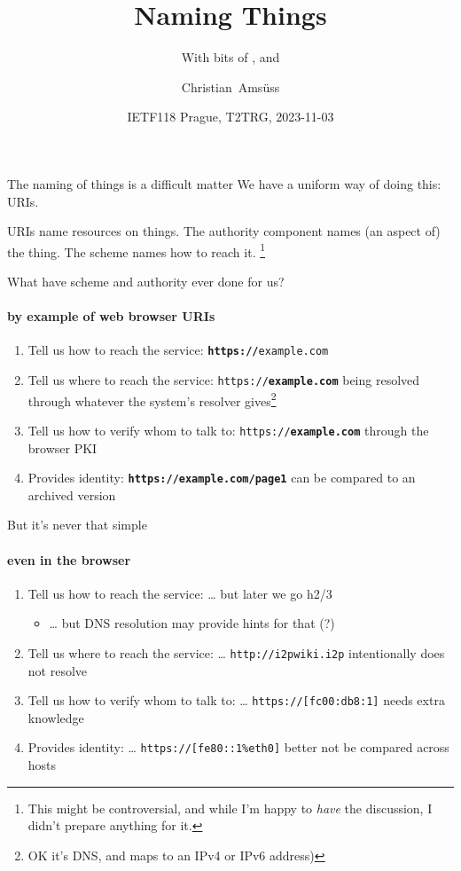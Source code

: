 \documentclass[aspectratio=169,colorlinks]{beamer}
\title{Naming Things}
\subtitle{With bits of \ietfdraft{amsuess-t2trg-onion-coap}, \ietfdraft{amsuess-core-coap-over-gatt} and \ietfdraft{amsuess-t2trg-rdlink}}
\author{Christian~Amsüss}
\date{IETF118 Prague, T2TRG, 2023-11-03}
\begin{document}
\frame{\titlepage}

\begin{frame}{The naming of things is a difficult matter}\Large
  We have a uniform way of doing this: URIs.

  \bigskip

  URIs name resources on things. The authority component names (an aspect of) the thing. The scheme names how to reach it.%
  \footnote{This might be controversial, and while I'm happy to \textit{have} the discussion, I didn't prepare anything for it.}
\end{frame}

\begin{frame}{What have scheme and authority ever done for us?}\framesubtitle{by example of web browser URIs}\Large
  \begin{enumerate}
    \item Tell us how to reach the service: \texttt{\textbf{https://}example.com}
    \item Tell us where to reach the service: \texttt{https://\textbf{example.com}} being resolved through whatever the system's resolver gives\footnote{OK it's DNS, and maps to an IPv4 or IPv6 address)}
    \item Tell us how to verify whom to talk to: \texttt{https://\textbf{example.com}} through the browser PKI
    \item Provides identity: \texttt{\textbf{https://example.com/page1}} can be compared to an archived version
  \end{enumerate}
\end{frame}

\begin{frame}{But it's never that simple}\framesubtitle{even in the browser}\Large
  \begin{enumerate}
    \item Tell us how to reach the service: \ldots{} but later we go h2/3
    \begin{itemize}
      \item \ldots{} but DNS resolution may provide hints for that (?)
    \end{itemize}
    \item Tell us where to reach the service: \ldots{} \texttt{http://i2pwiki.i2p} intentionally does not resolve
    \item Tell us how to verify whom to talk to: \ldots{} \texttt{https://[fc00:db8:1]} needs extra knowledge
    \item Provides identity: \ldots{} \texttt{https://[fe80::1\%eth0]} better not be compared across hosts
  \end{enumerate}
\end{frame}
\end{document}
